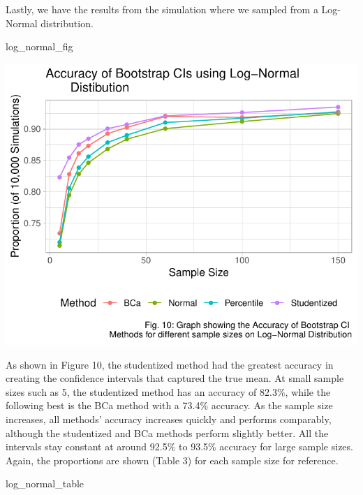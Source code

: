 \documentclass[12pt]{article}
\newenvironment{Shaded}{\begin{snugshade}}{\end{snugshade}}
\newcommand{\NormalTok}[1]{#1}
\begin{document}
Lastly, we have the results from the simulation where we sampled from a
Log-Normal distribution.

\begin{Shaded}
\begin{Highlighting}[]
\NormalTok{log\_normal\_fig}
\end{Highlighting}
\end{Shaded}

\includegraphics{paper_files/figure-latex/unnamed-chunk-22-1.pdf}

As shown in Figure 10, the studentized method had the greatest accuracy
in creating the confidence intervals that captured the true mean. At
small sample sizes such as 5, the studentized method has an accuracy of
82.3\%, while the following best is the BCa method with a 73.4\%
accuracy. As the sample size increases, all methods' accuracy increases
quickly and performs comparably, although the studentized and BCa
methods perform slightly better. All the intervals stay constant at
around 92.5\% to 93.5\% accuracy for large sample sizes. Again, the
proportions are shown (Table 3) for each sample size for reference.

\begin{Shaded}
\begin{Highlighting}[]
\NormalTok{log\_normal\_table}
\end{Highlighting}
\end{Shaded}
\end{document}
